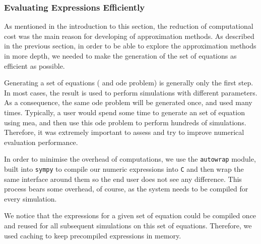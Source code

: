 \subsubsection{Evaluating Expressions Efficiently}


As mentioned in the introduction to this section, the reduction of computational cost was the main reason for developing of approximation methods.
As described in the previous section, in order to be able to explore the approximation methods in more depth,
we needed to make the generation of the set of equations as efficient as possible. 

Generating a set of equations (\ie{} and \gls{ode} problem) is generally only the first step.
In most cases, the result is used to perform simulations with different parameters.
As a consequence, the same \gls{ode} problem will be generated once, and used many times.
Typically, a user would spend some time to generate an set of equation using \gls{mea}, and then use this \gls{ode} problem to perform hundreds of simulations.
Therefore, it was extremely important to assess and try to improve numerical evaluation performance.
 


In order to minimise the overhead of computations, we use the {\tt autowrap} module, built into {\tt sympy} to compile our numeric expressions into \texttt{C}
and then wrap the same \py{} interface around them so the end user does not see any difference.
This process bears some overhead, of course, as the system needs to be compiled for every simulation.

We notice that the expressions for a given set of equation could be compiled once and reused for all subsequent simulations on this set of equations.
Therefore, we used caching to keep precompiled expressions in memory.
 
